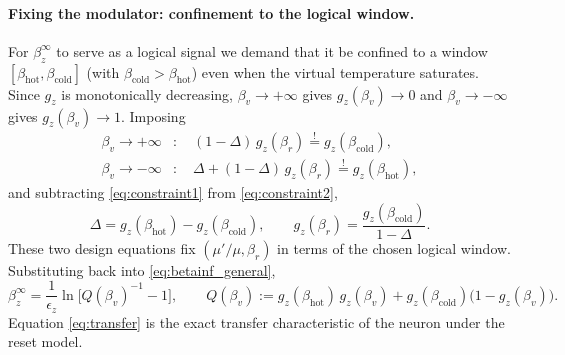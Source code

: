 \documentclass[11pt,a4paper]{article}
\theoremstyle{definition}
\theoremstyle{remark}
\begin{document}
\paragraph{Fixing the modulator: confinement to the logical window.}
For $\beta_z^\infty$ to serve as a logical signal we demand that it be
confined to a window $[\beta_{\mathrm{hot}},\beta_{\mathrm{cold}}]$
(with $\beta_{\mathrm{cold}}>\beta_{\mathrm{hot}}$) even when the
virtual temperature saturates. Since $g_z$ is monotonically decreasing,
$\beta_v\to+\infty$ gives $g_z(\beta_v)\to 0$ and
$\beta_v\to-\infty$ gives $g_z(\beta_v)\to 1$. Imposing
\begin{align}
\beta_v\to +\infty &: \quad
(1-\Delta)\,g_z(\beta_r) \overset{!}{=} g_z(\beta_{\mathrm{cold}}),
\label{eq:constraint1}\\
\beta_v\to -\infty &: \quad
\Delta + (1-\Delta)\,g_z(\beta_r) \overset{!}{=} g_z(\beta_{\mathrm{hot}}),
\label{eq:constraint2}
\end{align}
and subtracting \eqref{eq:constraint1} from \eqref{eq:constraint2},
\begin{equation}
\Delta = g_z(\beta_{\mathrm{hot}}) - g_z(\beta_{\mathrm{cold}}),
\qquad
g_z(\beta_r) = \frac{g_z(\beta_{\mathrm{cold}})}{1-\Delta}.
\label{eq:mod_design}
\end{equation}
These two design equations fix $(\mu'/\mu,\beta_r)$ in terms of the
chosen logical window. Substituting back into
\eqref{eq:betainf_general},
\begin{equation}
\beta_z^\infty = \frac{1}{\epsilon_z}\ln\!\big[Q(\beta_v)^{-1}-1\big],
\qquad
Q(\beta_v) := g_z(\beta_{\mathrm{hot}})\,g_z(\beta_v)
+ g_z(\beta_{\mathrm{cold}})\big(1-g_z(\beta_v)\big).
\label{eq:transfer}
\end{equation}
Equation \eqref{eq:transfer} is the exact transfer characteristic of
the neuron under the reset model.
 
\end{document}
